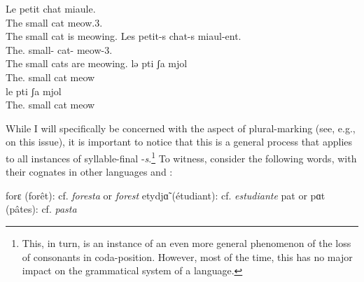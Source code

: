 \documentclass[output=paper,hidelinks]{langscibook}
\begin{document}
\begin{exe}
  \ex
  \begin{xlist}
    \ex \label{ex:cats-written-sg}
    \gll Le petit chat miaule.\\
    The small cat meow.3\SG.\PRES\\
    \glt The small cat is meowing.
    \ex \label{ex:cats-written}
    \gll Les petit-s chat-s miaul-ent.\\
    The.\PL{} small-{\PL} cat-{\PL} meow-3\PL.\PRES\\
    \glt The small cats are meowing.
    \ex \label{ex:cats-spoken-sg}
    \gll lə pti ʃa mjol\\
    The.\SG{} small cat meow\\
  \ex \label{ex:cats-spoken}
  \gll le pti ʃa mjol\\
  The.\PL{} small cat meow\\
  \end{xlist}
\end{exe}

While I will specifically be concerned with the aspect of plural-marking (see, e.g., \citealt{massot08} on this issue), it is important to notice that this is a general process that applies to all instances of syllable-final -\emph{s}.\footnote{This, in turn, is an instance of an even more general phenomenon of the loss of consonants in coda-position. However, most of the time, this has no major impact on the grammatical system of a language.} To witness, consider the following  words, with their cognates in other  languages and :

\begin{exe}
  \ex \label{ex:ex-es}
  \begin{xlist}
    \ex forɛ (forêt): cf.  \emph{foresta} or  \emph{forest}
    \ex etydj\~{ɑ} (étudiant): cf.  \emph{estudiante} 
    \ex pat or pɑt (pâtes): cf.  \emph{pasta}
  \end{xlist}
\end{exe}
\end{document}
